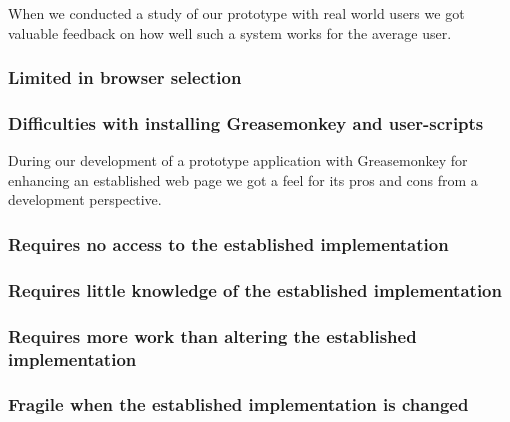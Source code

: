 When we conducted a study of our prototype with real world users
we got valuable feedback on how well such a system works for the average
user.

\subsubsection{Limited in browser selection}


\subsubsection{Difficulties with installing Greasemonkey and user-scripts}


\parabreak

During our development of a prototype application with Greasemonkey for
enhancing an established web page we got a feel for its pros and cons from a
development perspective.

\subsubsection{Requires no access to the established implementation}

\subsubsection{Requires little knowledge of the established implementation}

\subsubsection{Requires more work than altering the established
  implementation}

\subsubsection{Fragile when the established implementation is changed}

